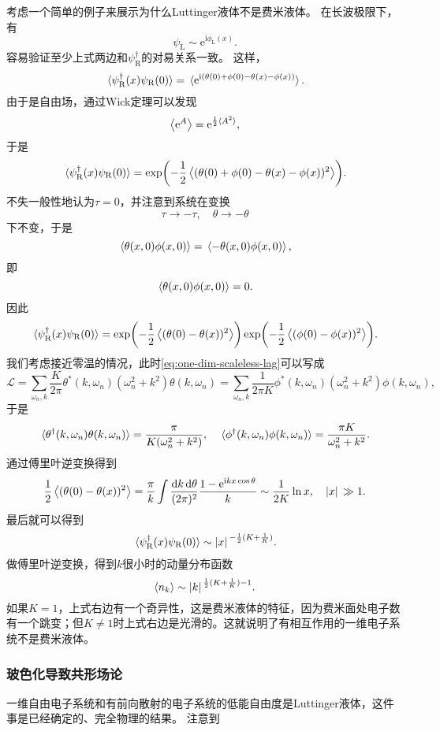 \documentclass[hyperref, UTF8, a4paper]{ctexart}
\newcommand*{\ii}{\mathrm{i}}
\newcommand*{\ee}{\mathrm{e}}
\begin{document}
考虑一个简单的例子来展示为什么Luttinger液体不是费米液体。
在长波极限下，有
\begin{equation}
    {\psi}_\text{L} \sim \ee^{\ii \phi_\text{L}(x)}.
\end{equation}
容易验证至少上式两边和${\psi}^\dagger_\text{R}$的对易关系一致。
这样，
\[
    \expval*{{\psi}_\text{R}^\dagger(x) {\psi}_\text{R}(0)} = \expval*{\ee^{\ii ({\theta}(0) + {\phi}(0) - {\theta}(x) - {\phi}(x))}}.
\]
由于是自由场，通过Wick定理可以发现
\[
    \expval{\ee^{{A}}} = \ee^{\frac{1}{2} \expval*{{A}^2}},
\]
于是
\[
    \expval*{{\psi}_\text{R}^\dagger(x) {\psi}_\text{R}(0)} = \exp(- \frac{1}{2} \expval{({\theta}(0) + {\phi}(0) - {\theta}(x) - {\phi}(x))^2}).
\]
不失一般性地认为$\tau=0$，并注意到系统在变换
\[
    \tau \longrightarrow - \tau, \quad \theta \longrightarrow -\theta
\]
下不变，于是
\[
    \expval*{{\theta}(x, 0) {\phi}(x, 0)} = \expval*{- {\theta}(x, 0) {\phi}(x, 0)},
\]
即
\[
    \expval*{{\theta}(x, 0) {\phi}(x, 0)} = 0.
\]
因此
\[
    \expval*{{\psi}_\text{R}^\dagger(x) {\psi}_\text{R}(0)} = \exp(- \frac{1}{2} \expval{({\theta}(0) - {\theta}(x))^2}) \exp(- \frac{1}{2} \expval{({\phi}(0) - {\phi}(x))^2}).
\]
我们考虑接近零温的情况，此时\eqref{eq:one-dim-scaleless-lag}可以写成
\[
    \mathcal{L} = \sum_{\omega_n, k} \frac{K}{2\pi} \theta^*(k, \omega_n) (\omega_n^2 + k^2) \theta(k, \omega_n) = \sum_{\omega_n, k} \frac{1}{2\pi K} \phi^*(k, \omega_n) (\omega_n^2 + k^2) \phi(k, \omega_n),
\]
于是
\[
    \expval*{{\theta}^\dagger(k, \omega_n) {\theta}(k, \omega_n)} = \frac{\pi}{K (\omega_n^2 + k^2)}, \quad \expval*{{\phi}^\dagger(k, \omega_n) {\phi}(k, \omega_n)} = \frac{\pi K}{\omega_n^2 + k^2}.
\]
通过傅里叶逆变换得到
\[
    \frac{1}{2} \expval{({\theta}(0) - {\theta}(x))^2} = \frac{\pi}{k} \int \frac{\dd{k} \dd{\theta}}{(2\pi)^2} \frac{1 - \ee^{\ii k x \cos \theta}}{k} \sim \frac{1}{2K} \ln x, \quad \abs*{x} \gg 1.
\]
最后就可以得到
\[
    \expval*{{\psi}_\text{R}^\dagger(x) {\psi}_\text{R}(0)} \sim \abs*{x}^{-\frac{1}{2}(K + \frac{1}{K})}.
\]
做傅里叶逆变换，得到$k$很小时的动量分布函数
\[
    \expval{{n}_k} \sim \abs*{k}^{\frac{1}{2}(K + \frac{1}{K}) - 1}.
\]
如果$K=1$，上式右边有一个奇异性，这是费米液体的特征，因为费米面处电子数有一个跳变；但$K \neq 1$时上式右边是光滑的。这就说明了有相互作用的一维电子系统不是费米液体。

\subsubsection{玻色化导致共形场论}

一维自由电子系统和有前向散射的电子系统的低能自由度是Luttinger液体，这件事是已经确定的、完全物理的结果。
注意到
\end{document}
